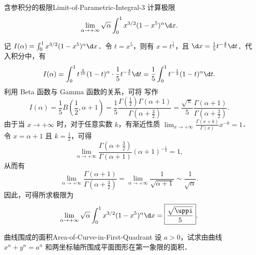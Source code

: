 \begin{problem}{含参积分的极限}{Limit-of-Parametric-Integral-3}
    计算极限
    \begin{equation}\label{eq:limit-prob}
        \lim_{\alpha\to+\infty} \sqrt{\alpha} \int_0^1 x^{3/2} (1-x^5)^\alpha \d x.
    \end{equation}
\end{problem}

\begin{solution}
    记 $I(\alpha) = \int_0^1 x^{3/2} (1-x^5)^\alpha \d x$．令 $t = x^5$，则有 $x = t^{\frac{1}{5}}$，且 $\d x = \frac{1}{5} t^{-\frac{4}{5}} \d t$．代入积分中，有
    \begin{equation}\label{eq:limit-sub}
        I(\alpha) = \int_0^1 t^{\frac{3}{10}} (1-t)^\alpha \cdot \frac{1}{5} t^{-\frac{4}{5}} \d t = \frac{1}{5} \int_0^1 t^{-\frac{1}{2}} (1-t)^\alpha \d t.
    \end{equation}
    利用 Beta 函数与 Gamma 函数的关系，可将  写作
    \begin{equation}\label{eq:limit-beta}
        I(\alpha) = \frac{1}{5} B\left(\frac{1}{2}, \alpha+1\right) = \frac{1}{5} \frac{\Gamma\left(\frac{1}{2}\right) \Gamma(\alpha+1)}{\Gamma\left(\alpha+\frac{3}{2}\right)} = \frac{\sqrt{\uppi}}{5} \frac{\Gamma(\alpha+1)}{\Gamma\left(\alpha+\frac{3}{2}\right)}.
    \end{equation}
    由于当 $x \to +\infty$ 时，对于任意实数 $k$，有渐近性质 $\lim_{x\to+\infty} \frac{\Gamma(x+k)}{\Gamma(x)} x^{-k} = 1$．令 $x = \alpha+1$ 且 $k = \frac{1}{2}$，可得
    \begin{equation}\label{eq:limit-gamma-ratio}
        \lim_{\alpha\to+\infty} \frac{\Gamma\left(\alpha+\frac{3}{2}\right)}{\Gamma(\alpha+1)} (\alpha+1)^{-\frac{1}{2}} = 1,
    \end{equation}
    从而有
    \begin{equation}\label{eq:limit-gamma-approx}
        \lim_{\alpha\to+\infty} \frac{\Gamma(\alpha+1)}{\Gamma\left(\alpha+\frac{3}{2}\right)} = \lim_{\alpha\to+\infty} \frac{1}{\sqrt{\alpha+1}} \sim \frac{1}{\sqrt{\alpha}}.
    \end{equation}
    因此，可得所求极限为
    \begin{equation}\label{eq:limit-final}
        \lim_{\alpha\to+\infty} \sqrt{\alpha} \int_0^1 x^{3/2} (1-x^5)^\alpha \d x = \boxed{\frac{\sqrt{\uppi}}{5}}.
    \end{equation}
\end{solution}

\begin{problem}{曲线围成的面积}{Area-of-Curve-in-First-Quadrant}
    设 $a > 0$，试求由曲线 $x^n + y^n = a^n$ 和两坐标轴所围成平面图形在第一象限的面积．
\end{problem}

